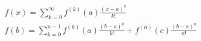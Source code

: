 \begin{align}
&f(x)=\sum_{k=0}^{\infty}f^{(k)}(a)\frac{(x-a)^k}{k!} \\
&f(b)=\sum_{k=0}^{n-1}f^{(k)}(a)\frac{(b-a)^k}{k!}+f^{(n)}(c)\frac{(b-a)^n}{n!}
\end{align}